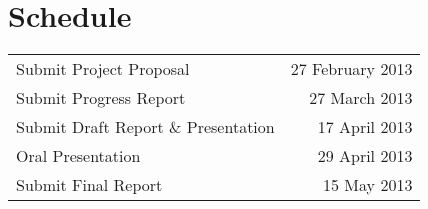 \section{Schedule}
  \begin{tabular}{lr}
    Submit Project Proposal             & 27 February 2013\\
    Submit Progress Report              & 27 March 2013   \\
    Submit Draft Report \& Presentation & 17 April 2013   \\
    Oral Presentation                   & 29 April 2013   \\
    Submit Final Report                 & 15 May 2013     \\
  \end{tabular}
  
